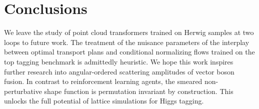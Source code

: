 \section{Conclusions}\label{sec:conclusions}

We leave the study of point cloud transformers trained on Herwig samples
at two loops to future work. The treatment of the nuisance parameters of
the interplay between optimal transport plans and conditional
normalizing flows trained on the top tagging benchmark is admittedly
heuristic. We hope this work inspires further research into
angular-ordered scattering amplitudes of vector boson fusion. In
contrast to reinforcement learning agents, the smeared non-perturbative
shape function is permutation invariant by construction. This unlocks
the full potential of lattice simulations for Higgs tagging.

